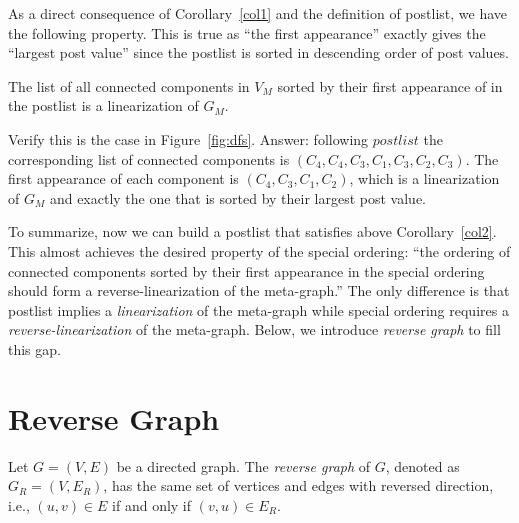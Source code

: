 As a direct consequence of Corollary~\ref{col1} and the definition of postlist, we have the following property.
This is true as ``the first appearance'' exactly gives the ``largest post value'' since the postlist is sorted 
in descending order of post values.

\begin{corollary}
The list of all connected components in $V_M$
sorted by their first appearance of in the postlist is a linearization of $G_M$.
\label{col2}
\end{corollary}

Verify this is the case in Figure~\ref{fig:dfs}. Answer: following $postlist$ the corresponding list of 
connected components is $(C_4, C_4, C_3, C_1, C_3, C_2, C_3)$.
The first appearance of each component is $(C_4, C_3, C_1, C_2)$, which is a linearization of $G_M$
and exactly the one that is sorted by their largest post value.


To summarize, now we can build a postlist that satisfies above Corollary~\ref{col2}.
This almost achieves the desired property of the special ordering:
``the ordering of connected components sorted by their first appearance in the
special ordering should form a reverse-linearization of the meta-graph.''
The only difference is that postlist implies a \emph{linearization} of the meta-graph
while special ordering requires a \emph{reverse-linearization} of the meta-graph.
Below, we introduce \emph{reverse graph} to fill this gap.

\section*{Reverse Graph}

\begin{definition}
Let $G = (V,E)$ be a directed graph. The \emph{reverse graph} of $G$, denoted as $G_R = (V, E_R)$,
has the same set of vertices and edges with reversed direction, i.e., $(u,v) \in E$ if and only if $(v,u)\in E_R$.
\end{definition}

